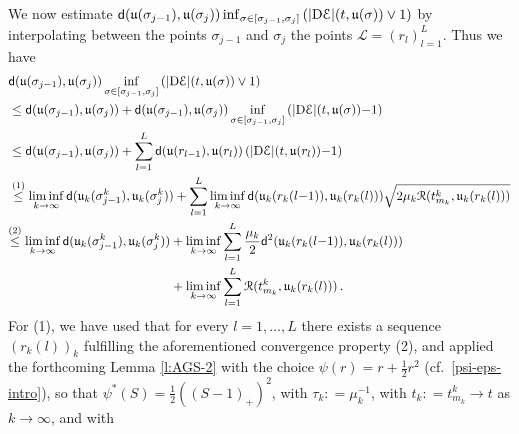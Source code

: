 \documentclass[a4paper,10pt,reqno]{amsart} %
\newcommand{\N}{\mathbb{N}}
\numberwithin{equation}{section}
\def\rmD{{\mathrm D}} \def\rmE{{\mathrm E}} \def\rmF{{\mathrm F}}
\newcommand{\mdn}{\mathsf{d}}
\newcommand{\md}[2]{\mathsf{d}(#1,#2)}
\newcommand{\ene}[2]{\mathcal{E}(#1,#2)}
\newcommand{\rstab}[2]{\mathcal{R}(#1,#2)}
\newcommand{\slope}[3]{|\rmD {#1}|(#2,#3)}
\newcommand{\invcur}[1]{\mathfrak{u}_{#1}}
\newcommand{\invcu}{\mathfrak{u}}
\newcommand{\RRR}{\color{red}}
\newcommand{\EEE}{\color{black}}
\begin{document}
\par
We now estimate $\md{\invcu(\sigma_{j-1})}{\invcu(\sigma_j)} \inf_{\sigma \in [\sigma_{j-1},\sigma_j]} \left( \slope \calE t{\invcu(\sigma)} \vee 1 \right) $ by interpolating between the points $\sigma_{j-1}$ and $\sigma_j$ the points   $ \mathscr{L}=(r_l)_{l=1}^L$. 
Thus we have 
\begin{equation}
\label{case2.2}
\begin{aligned}
&
\md{\invcu(\sigma_{j-1})}{\invcu(\sigma_j)} \inf_{\sigma \in [\sigma_{j-1},\sigma_j]} \left( \slope \calE t{\invcu(\sigma)} \vee 1 \right)  
\\
 & \leq
\md{\invcu(\sigma_{j-1})}{\invcu(\sigma_j)}  + \md{\invcu(\sigma_{j-1})}{\invcu(\sigma_j)}  \inf_{\sigma \in [\sigma_{j-1},\sigma_j]} \left( \slope \calE t{\invcu(\sigma)}{-} 1 \right) 
\\
& 
\leq
\md{\invcu(\sigma_{j-1})}{\invcu(\sigma_j)}  +
 \sum_{l=1}^L  \md{\invcu(r_{l-1})}{\invcu(r_l)}\left( \slope \calE t{\invcu(r_l)} {-}1\right)
\\
& 
\stackrel{(1)}{\leq}
 \liminf_{k\to\infty}  \md{\invcur k(\sigma_{j-1}^k)}{\invcur k (\sigma_j^k)} +
 \sum_{l=1}^L  \liminf_{k\to\infty} \md{\invcur k (r_k(l{-}1))}{\invcur k (r_k(l))}
 \sqrt{2\mu_k \rstab {t_{{m}_k}^k}{\invcur k(r_k(l))}}
\\
&
\begin{aligned}
\stackrel{(2)}{\leq}
 \liminf_{k\to\infty}  \md{\invcur k(\sigma_{j-1}^k)}{\invcur k (\sigma_j^k)} &  +
  \liminf_{k\to\infty}   \sum_{l=1}^L 
\frac{\mu_k}2 \mdn^2(\invcur k (r_{k}(l{-}1)),\invcur k (r_k(l)))  \\ & +  \liminf_{k\to\infty}  \sum_{l=1}^L     \rstab {t_{{m}_k}^k}{\invcur k(r_k(l))}\,.
\end{aligned}
\end{aligned}
\end{equation}
For {\footnotesize (1)},  we have used that for every  $l=1,\ldots, L$
there exists a sequence $(r_k(l))_k$ fulfilling the aforementioned convergence property (2), and applied the forthcoming 
 Lemma \ref{l:AGS-2}  with the choice $\psi(r) = r +\frac12 r^2$ (cf.\ \eqref{psi-eps-intro}), so that $\psi^*(S) =\frac12 ((S{-}1)_+)^2$, %
   with  $\tau_k : = \mu_k^{-1}$, with $t_k: = t_{{m}_k}^k \to t$ as $k\to\infty$, and with
\end{document}

